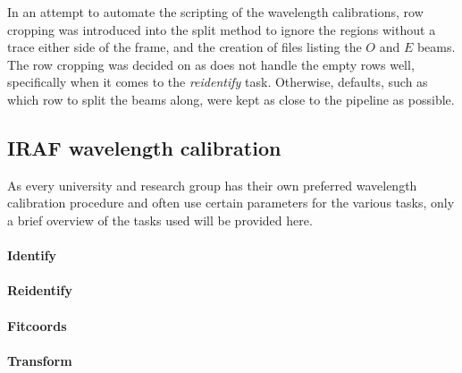 In an attempt to automate the scripting of the \iraf wavelength calibrations, row cropping was introduced into the split method to ignore the regions without a trace either side of the frame, and the creation of files listing the $O$ and $E$ beams. The row cropping was decided on as \iraf does not handle the empty rows well, specifically when it comes to the \textit{reidentify} task. Otherwise, defaults, such as which row to split the beams along, were kept as close to the \polsalt pipeline as possible.


\subsection{IRAF wavelength calibration}\label{subsec:IRAF_wav_cal}

As every university and research group has their own preferred wavelength calibration procedure and often use certain parameters for the various \iraf tasks, only a brief overview of the tasks used will be provided here.

\paragraph{Identify}
\prgph

\paragraph{Reidentify}
\prgph

\paragraph{Fitcoords}
\prgph

\paragraph{Transform}
\prgph


